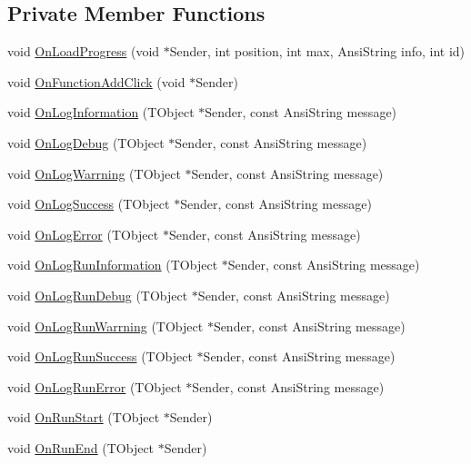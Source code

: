 \subsection*{Private Member Functions}
\begin{CompactItemize}
\item 
void \hyperlink{classTForm1_4e07d96a5ae579b4ee90fa1b7744e7a2}{OnLoadProgress} (void $\ast$Sender, int position, int max, AnsiString info, int id)
\item 
void \hyperlink{classTForm1_9daceac11a528e49d52a5131e12aebe5}{OnFunctionAddClick} (void $\ast$Sender)
\item 
void \hyperlink{classTForm1_75b6c8accb0441ab6aaa5c6cc834bea0}{OnLogInformation} (TObject $\ast$Sender, const AnsiString message)
\item 
void \hyperlink{classTForm1_9673ad61a576d47d7ad53cb13a3e5a4d}{OnLogDebug} (TObject $\ast$Sender, const AnsiString message)
\item 
void \hyperlink{classTForm1_dfbe2953cac1319d0754474438b2d2b6}{OnLogWarrning} (TObject $\ast$Sender, const AnsiString message)
\item 
void \hyperlink{classTForm1_067a9fd8ad4f3b2a59c34f8e317cbbc7}{OnLogSuccess} (TObject $\ast$Sender, const AnsiString message)
\item 
void \hyperlink{classTForm1_080ddd93d3196c33b74c50c15b3720eb}{OnLogError} (TObject $\ast$Sender, const AnsiString message)
\item 
void \hyperlink{classTForm1_cf5d1f0fac58364f539deb0bd46c4c49}{OnLogRunInformation} (TObject $\ast$Sender, const AnsiString message)
\item 
void \hyperlink{classTForm1_62c5ecb809ce9a5473816fb013f4260e}{OnLogRunDebug} (TObject $\ast$Sender, const AnsiString message)
\item 
void \hyperlink{classTForm1_807c0c99b2bbeb91113b83131309cecc}{OnLogRunWarrning} (TObject $\ast$Sender, const AnsiString message)
\item 
void \hyperlink{classTForm1_9d4f79fae095cda30188324ad61a95a0}{OnLogRunSuccess} (TObject $\ast$Sender, const AnsiString message)
\item 
void \hyperlink{classTForm1_ffda0a341f5610795fb4815bc8e138ec}{OnLogRunError} (TObject $\ast$Sender, const AnsiString message)
\item 
void \hyperlink{classTForm1_7295024a0639ad522328b213cb06e821}{OnRunStart} (TObject $\ast$Sender)
\item 
void \hyperlink{classTForm1_c404db6653ee5eca5c04ae0fb9e8e5fd}{OnRunEnd} (TObject $\ast$Sender)

\end{CompactItemize}
